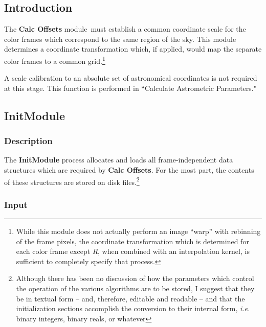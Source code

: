 \newcommand{\mcm}{{\bf Calc Offsets} module}
\newcommand{\mc}{{\bf Calc Offsets}}
\newcommand{\refcolor}{{\it R}}
\renewcommand{\labelitemii}{$\circ$}
\setcounter{footnote}{0}

\subsection{Introduction}

The \mcm\ must establish a common coordinate scale for the color frames which
correspond to the same region of the sky.
This module determines a coordinate transformation
which, if applied, would map the separate color frames to a common
grid.\footnote{While this module does not actually perform an image ``warp''
with rebinning of the frame pixels, the coordinate transformation which is
determined for each color frame except \refcolor, when combined with an
interpolation kernel, is sufficient to completely specify that process.}

A scale calibration to an absolute set of astronomical
coordinates is not required at this stage.  This function is performed in
``Calculate Astrometric Parameters."
                                                             
\subsection{InitModule}

\subsubsection{Description}

The {\bf InitModule} process allocates and loads all frame-independent data
structures which are required by \mc.
For the most part, the contents of these structures are stored on disk
files.\footnote{Although there has been no discussion of how the parameters
which control the operation of the various algorithms are to be stored, I
suggest that they be in textual form -- and, therefore, editable and readable
-- and that the initialization sections accomplish the conversion to their
internal form, {\it i.e.} binary integers, binary reals, or whatever}

\subsubsection{Input}

